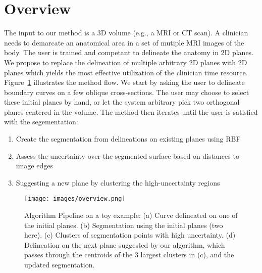 \section{Overview}
\label{sec:overview}

The input to our method is a 3D volume (e.g., a MRI or CT scan). A clinician needs to demarcate an anatomical area in a set of mutiple MRI images of the body. The user is trained and competant to delineate the anatomy in 2D planes. We propose to replace the delineation of multiple arbitrary 2D planes with 2D planes which yields the most effective utilization of the clinician time resource. Figure~\ref{fig:overview_image} illustrates the method flow.
We start by asking the user to delineate boundary curves on a few oblique cross-sections. The user may choose to select these initial planes by hand, or let the system arbitrary pick two orthogonal planes centered in the volume.
The method then iterates until the user is satisfied with the segementation:
\begin{enumerate}
	\item Create the segmentation from delineations on existing planes using RBF
	\item Assess the uncertainty over the segmented surface based on distances to image edges
	\item Suggesting a new plane by clustering the high-uncertainty regions
\end{enumerate}

\begin{figure}[hb]
\centering
  \texttt{[image: images/overview.png]}
  \caption[Algorithm Pipeline]
  {
Algorithm Pipeline on a toy example: (a) Curve delineated on one of the initial planes. (b) Segmentation using the initial planes (two here). (c) Clusters of segmentation points with high uncertainty. (d) Delineation on the next plane suggested by our algorithm, which passes through the centroids of the 3 largest clusters in (c), and the updated segmentation.  
  }\label{fig:overview_image}
\end{figure}

